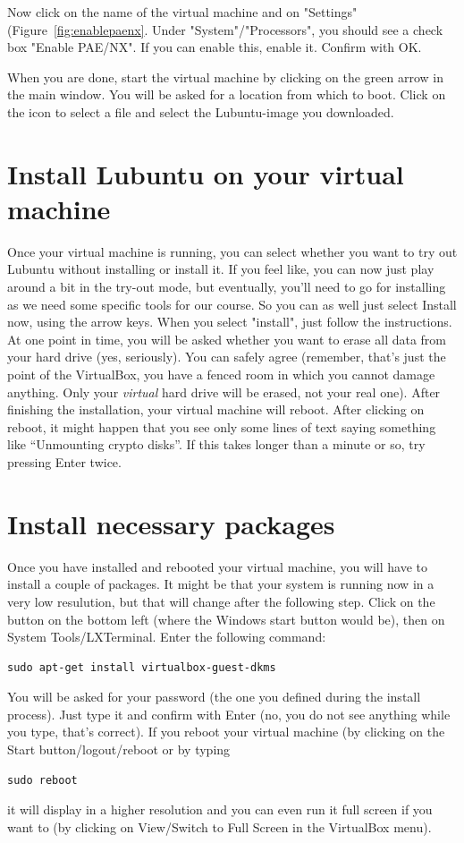 \documentclass[a4paper,12pt]{book}
\begin{document}
Now click on the name of the virtual machine and on "Settings" (Figure~\ref{fig:enablepaenx}. Under "System"/"Processors", you should see a check box "Enable PAE/NX". If you can enable this, enable it. Confirm with OK.

When you are done, start the virtual machine by clicking on the green arrow in the main window. You will be asked for a location from which to boot. Click on the icon to select a file and select the Lubuntu-image you downloaded.


\section{Install Lubuntu on your virtual machine}
Once your virtual machine is running, you can select whether you want to try out Lubuntu without installing or install it. If you feel like, you can now just play around a bit in the try-out mode, but eventually, you'll need to go for installing as we need some specific tools for our course. So you can as well just select Install now, using the arrow keys.
When you select "install", just follow the instructions. At one point in time, you will be asked whether you want to erase all data from your hard drive (yes, seriously). You can safely agree (remember, that's just the point of the VirtualBox, you have a fenced room in which you cannot damage anything. Only your \emph{virtual} hard drive will be erased, not your real one).
After finishing the installation, your virtual machine will reboot. After clicking on reboot, it might happen that you see only some lines of text saying something like ``Unmounting crypto disks''. If this takes longer than a minute or so, try pressing Enter twice. 



\section{Install necessary packages}
Once you have installed and rebooted your virtual machine, you will have to install a couple of packages. It might be that your system is running now in a very low resulution, but that will change after the following step.  Click on the button on the bottom left (where the Windows start button would be), then on System Tools/LXTerminal. Enter the following command:
\begin{lstlisting}
sudo apt-get install virtualbox-guest-dkms
\end{lstlisting}
You will be asked for your password (the one you defined during the install process). Just type it and confirm with Enter (no, you do not see anything while you type, that's correct). 
If you reboot your virtual machine (by clicking on the Start button/logout/reboot or by typing
\begin{lstlisting}
sudo reboot
\end{lstlisting}
it will display in a higher resolution and you can even run it full screen if you want to (by clicking on View/Switch to Full Screen in the VirtualBox menu).
\end{document}
